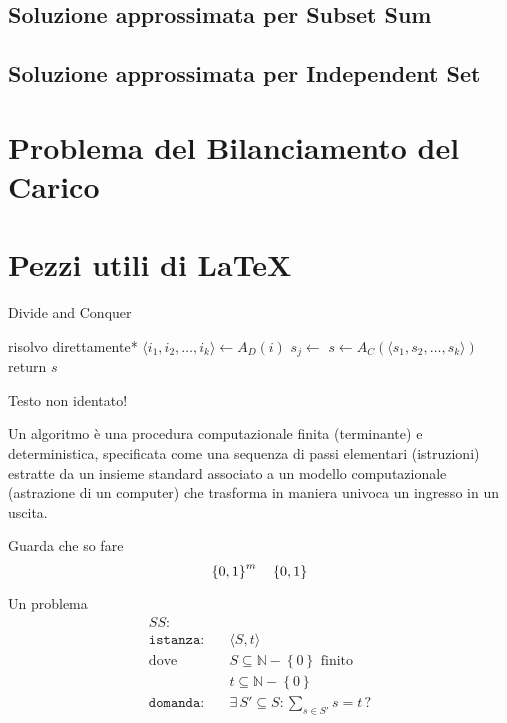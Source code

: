 \subsection{Soluzione approssimata per Subset Sum}

\subsection{Soluzione approssimata per Independent Set}

\section{Problema del Bilanciamento del Carico}

\section{Pezzi utili di \LaTeX{}}
\begin{algorithm}[H]
\caption{Divide and Conquer}\label{alg:dnc}
\begin{algorithmic}[1]
            \State *risolvo direttamente*
        \EndIf
        \State $\langle i_1, i_2, \dots, i_k \rangle \gets A_D(i)$ 
            \State $s_j \gets $ 
        \EndFor
        \State $s \gets A_C(\langle s_1, s_2, \dots, s_k \rangle)$
        \State return $s$
    \EndProcedure
\end{algorithmic}
\end{algorithm}
\noindent
Testo non identato!

\begin{definition}[Algoritmo]\label{def:algex}
    Un algoritmo è una procedura computazionale finita (terminante) e deterministica, specificata come una sequenza di passi elementari (istruzioni) estratte da un insieme standard associato a un modello computazionale (astrazione di un computer) che trasforma in maniera univoca un ingresso in un uscita.
\end{definition}

Guarda che so fare
\begin{equation*}
    \left\{0,1\right\}^{m}
    \quad
    \left\{0,1\right\}^{}
\end{equation*}

Un problema
\begin{align*}
    SS: & \\
    \texttt{istanza:} \quad & \langle S,t \rangle \\
    \text{dove} \quad & S \subseteq \mathbb{N} - \left\{ 0 \right\} \text{ finito} \\
    & t \subseteq \mathbb{N} - \left\{ 0 \right\} \\
    \texttt{domanda:} \quad & \exists \, S' \subseteq S : \sum_{s \in S'}^{} s = t \, ?
\end{align*}

